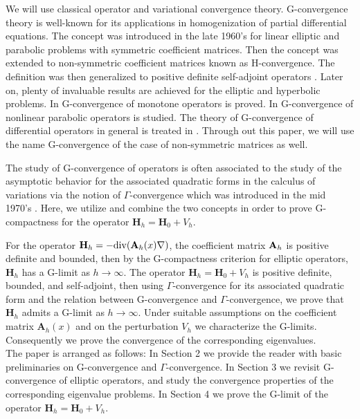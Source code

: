 \documentclass[11pt, epsf]{amsart}
\begin{document}
We will use classical operator and variational convergence theory. G-convergence theory is well-known for its applications in homogenization of partial differential equations. The concept was introduced in the late 1960's \cite{DEGS,SPA67,SPA68,SPA75} for linear elliptic and parabolic problems with symmetric coefficient matrices. Then the concept was extended to non-symmetric coefficient matrices \cite{MUR,TAR1,TAR2,TAR3} known as H-convergence. The definition was then generalized to positive definite self-adjoint operators \cite{DAL}. Later on, plenty of invaluable results are achieved for the elliptic and hyperbolic problems. In \cite{BRAC,CHDA,CHDE} G-convergence of monotone operators is proved. In \cite{SVA99,SVA00,SVA05} G-convergence of nonlinear parabolic operators is studied. The theory of G-convergence of differential operators in general is treated in \cite{ZKO,ZKOk}. Through out this paper, we will use the name G-convergence of the case of non-symmetric matrices as well.

The study of G-convergence of operators is often associated to the study of the asymptotic behavior for the associated quadratic forms in the calculus of variations via the notion of $\Gamma$-convergence which was introduced in the mid 1970's \cite{DEGF}. Here, we utilize and combine the two concepts in order to prove G-compactness for the operator $\mathbf{H}_h=\mathbf{H}_0+V_h$.

For the operator $\mathbf{H}_h=-{\rm div}(\text{\textbf{A}}_h(x)\nabla)$, the coefficient matrix $\text{\textbf{A}}_h$ is positive definite and bounded, then by the G-compactness criterion for elliptic operators, $\mathbf{H}_h$ has a G-limit as $h\to\infty$. The operator $\mathbf{H}_h=\mathbf{H}_0+V_h$ is positive definite, bounded, and self-adjoint, then using $\Gamma$-convergence for its associated quadratic form and the relation between G-convergence and $\Gamma$-convergence, we prove that $\mathbf{H}_h$ admits a G-limit as $h\to\infty$. Under suitable assumptions on the coefficient matrix $\textbf{A}_h(x)$ and on the perturbation $V_h$ we characterize the G-limits. Consequently we prove the convergence of the corresponding eigenvalues.\\

The paper is arranged as follows: In Section 2 we provide the reader with basic preliminaries on G-convergence and $\Gamma$-convergence. In Section 3 we revisit G-convergence of elliptic operators, and study the convergence properties of the corresponding eigenvalue problems. In Section 4 we prove the G-limit of the operator $\mathbf{H}_h=\mathbf{H}_0+V_h$.
\end{document}
